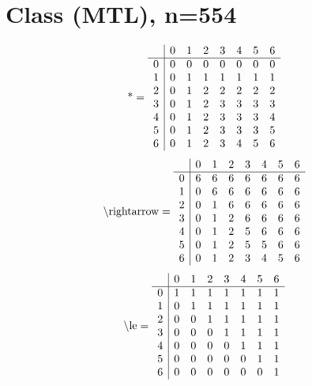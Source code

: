 \documentclass[11pt]{article}
\begin{document}
\section{Class (MTL), n=554}
\[\text{*} = 
\begin{array}{r | r r r r r r r}
 & 0 & 1 & 2 & 3 & 4 & 5 & 6 \\ \hline
0 & 0 & 0 & 0 & 0 & 0 & 0 & 0 \\
1 & 0 & 1 & 1 & 1 & 1 & 1 & 1 \\
2 & 0 & 1 & 2 & 2 & 2 & 2 & 2 \\
3 & 0 & 1 & 2 & 3 & 3 & 3 & 3 \\
4 & 0 & 1 & 2 & 3 & 3 & 3 & 4 \\
5 & 0 & 1 & 2 & 3 & 3 & 3 & 5 \\
6 & 0 & 1 & 2 & 3 & 4 & 5 & 6 \\
\end{array}
\]
\[\text{\textbackslash rightarrow} = 
\begin{array}{r | r r r r r r r}
 & 0 & 1 & 2 & 3 & 4 & 5 & 6 \\ \hline
0 & 6 & 6 & 6 & 6 & 6 & 6 & 6 \\
1 & 0 & 6 & 6 & 6 & 6 & 6 & 6 \\
2 & 0 & 1 & 6 & 6 & 6 & 6 & 6 \\
3 & 0 & 1 & 2 & 6 & 6 & 6 & 6 \\
4 & 0 & 1 & 2 & 5 & 6 & 6 & 6 \\
5 & 0 & 1 & 2 & 5 & 5 & 6 & 6 \\
6 & 0 & 1 & 2 & 3 & 4 & 5 & 6 \\
\end{array}
\]
\[\text{\textbackslash le} = 
\begin{array}{r | r r r r r r r}
 & 0 & 1 & 2 & 3 & 4 & 5 & 6 \\ \hline
0 & 1 & 1 & 1 & 1 & 1 & 1 & 1 \\
1 & 0 & 1 & 1 & 1 & 1 & 1 & 1 \\
2 & 0 & 0 & 1 & 1 & 1 & 1 & 1 \\
3 & 0 & 0 & 0 & 1 & 1 & 1 & 1 \\
4 & 0 & 0 & 0 & 0 & 1 & 1 & 1 \\
5 & 0 & 0 & 0 & 0 & 0 & 1 & 1 \\
6 & 0 & 0 & 0 & 0 & 0 & 0 & 1 \\
\end{array}
\]
\end{document}
